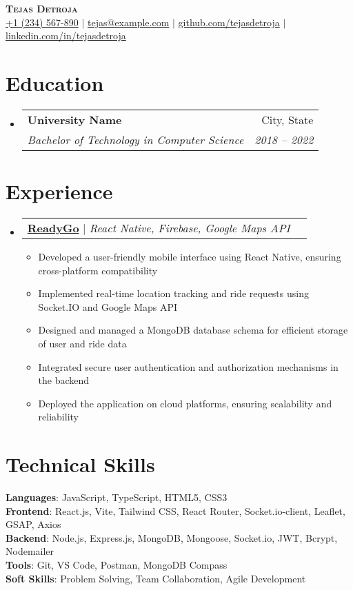 \documentclass[letterpaper,11pt]{article}
\makeatletter
\newcommand{\resumeItem}[1]{
  \item\small{
    {#1 \vspace{-2pt}}
  }
}
\newcommand{\resumeSubheading}[4]{
  \vspace{-2pt}\item
    \begin{tabular*}{0.97\textwidth}[t]{l@{\extracolsep{\fill}}r}
      \textbf{#1} & #2 \\
      \textit{\small#3} & \textit{\small #4} \\
    \end{tabular*}\vspace{-7pt}
}
\newcommand{\resumeProjectHeading}[2]{
    \item
    \begin{tabular*}{0.97\textwidth}{l@{\extracolsep{\fill}}r}
      \small#1 & #2 \\
    \end{tabular*}\vspace{-7pt}
}
\newcommand{\resumeSubHeadingListStart}{\begin{itemize}[leftmargin=0.15in, label={}]}
\newcommand{\resumeSubHeadingListEnd}{\end{itemize}}
\newcommand{\resumeItemListStart}{\begin{itemize}}
\newcommand{\resumeItemListEnd}{\end{itemize}\vspace{-5pt}}
\makeatother
\begin{document}
\begin{center}
    \textbf{\Huge \scshape Tejas Detroja} \\ \vspace{3pt}
    \small
    \faMobile* \hspace{.5pt} \href{tel:+1234567890}{+1 (234) 567-890} $|$ 
    \faEnvelope \hspace{.5pt} \href{mailto:tejas@example.com}{tejas@example.com} $|$
    \faGithub \hspace{.5pt} \href{https://github.com/tejasdetroja}{github.com/tejasdetroja} $|$
    \faLinkedin \hspace{.5pt} \href{https://linkedin.com/in/tejasdetroja}{linkedin.com/in/tejasdetroja}
\end{center}

\section{Education}
  \resumeSubHeadingListStart
    \resumeSubheading
      {University Name}{City, State}
      {Bachelor of Technology in Computer Science}{2018 -- 2022}
  \resumeSubHeadingListEnd

\section{Experience}
  \resumeSubHeadingListStart
    \resumeProjectHeading
      {\textbf{\href{https://github.com/tejasdetroja15/ReadyGo}{ReadyGo}} $|$ \emph{React Native, Firebase, Google Maps API}}{}
    \resumeItemListStart
      \resumeItem{Developed a user-friendly mobile interface using React Native, ensuring cross-platform compatibility}
      \resumeItem{Implemented real-time location tracking and ride requests using Socket.IO and Google Maps API}
      \resumeItem{Designed and managed a MongoDB database schema for efficient storage of user and ride data}
      \resumeItem{Integrated secure user authentication and authorization mechanisms in the backend}
      \resumeItem{Deployed the application on cloud platforms, ensuring scalability and reliability}
    \resumeItemListEnd
  \resumeSubHeadingListEnd

\section{Technical Skills}
  \begin{itemize}[leftmargin=0.15in, label={}]
    \small{\item{
     \textbf{Languages}{: JavaScript, TypeScript, HTML5, CSS3} \\
     \textbf{Frontend}{: React.js, Vite, Tailwind CSS, React Router, Socket.io-client, Leaflet, GSAP, Axios} \\
     \textbf{Backend}{: Node.js, Express.js, MongoDB, Mongoose, Socket.io, JWT, Bcrypt, Nodemailer} \\
     \textbf{Tools}{: Git, VS Code, Postman, MongoDB Compass} \\
     \textbf{Soft Skills}{: Problem Solving, Team Collaboration, Agile Development}
    }}
  \end{itemize}
\end{document}
